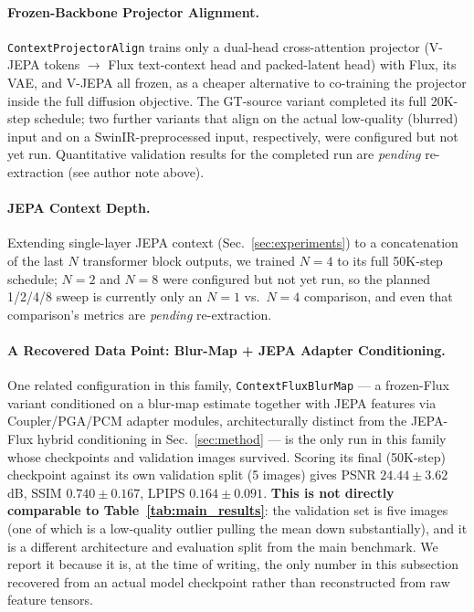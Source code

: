 \documentclass{article}
\begin{document}
\paragraph{Frozen-Backbone Projector Alignment.}
\texttt{ContextProjectorAlign} trains only a dual-head cross-attention projector (V-JEPA tokens $\to$ Flux text-context head and packed-latent head) with Flux, its VAE, and V-JEPA all frozen, as a cheaper alternative to co-training the projector inside the full diffusion objective. The GT-source variant completed its full 20K-step schedule; two further variants that align on the actual low-quality (blurred) input and on a SwinIR-preprocessed input, respectively, were configured but not yet run. Quantitative validation results for the completed run are \textit{pending} re-extraction (see author note above).

\paragraph{JEPA Context Depth.}
Extending single-layer JEPA context (Sec.~\ref{sec:experiments}) to a concatenation of the last $N$ transformer block outputs, we trained $N{=}4$ to its full 50K-step schedule; $N{=}2$ and $N{=}8$ were configured but not yet run, so the planned 1/2/4/8 sweep is currently only an $N{=}1$ vs.\ $N{=}4$ comparison, and even that comparison's metrics are \textit{pending} re-extraction.

\paragraph{A Recovered Data Point: Blur-Map + JEPA Adapter Conditioning.}
One related configuration in this family, \texttt{ContextFluxBlurMap} --- a frozen-Flux variant conditioned on a blur-map estimate together with JEPA features via Coupler/PGA/PCM adapter modules, architecturally distinct from the JEPA-Flux hybrid conditioning in Sec.~\ref{sec:method} --- is the only run in this family whose checkpoints and validation images survived. Scoring its final (50K-step) checkpoint against its own validation split (5 images) gives PSNR $24.44 \pm 3.62$\,dB, SSIM $0.740 \pm 0.167$, LPIPS $0.164 \pm 0.091$. \textbf{This is not directly comparable to Table~\ref{tab:main_results}}: the validation set is five images (one of which is a low-quality outlier pulling the mean down substantially), and it is a different architecture and evaluation split from the main benchmark. We report it because it is, at the time of writing, the only number in this subsection recovered from an actual model checkpoint rather than reconstructed from raw feature tensors.
\end{document}
